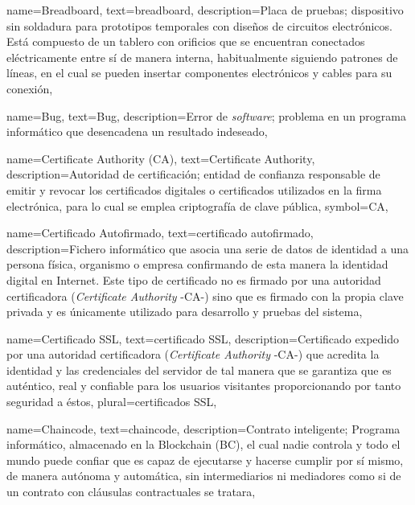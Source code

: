 {
    name={Breadboard},
    text={breadboard},
    description={Placa de pruebas; dispositivo sin soldadura para prototipos temporales con diseños de circuitos electrónicos. Está compuesto de un tablero con orificios que se encuentran conectados eléctricamente entre sí de manera interna, habitualmente siguiendo patrones de líneas, en el cual se pueden insertar componentes electrónicos y cables para su conexión},
}

{
    name={Bug},
    text={Bug},
    description={Error de \textit{software}; problema en un programa informático que desencadena un resultado indeseado},
}

{
    name={Certificate Authority (CA)},
    text={Certificate Authority},
    description={Autoridad de certificación; entidad de confianza responsable de emitir y revocar los certificados digitales o certificados utilizados en la firma electrónica, para lo cual se emplea criptografía de clave pública},
    symbol={CA},
}

{
    name={Certificado Autofirmado},
    text={certificado autofirmado},
    description={Fichero informático que asocia una serie de datos de identidad a una persona física, organismo o empresa confirmando de esta manera la identidad digital en Internet. Este tipo de certificado no es firmado por una autoridad certificadora (\textit{Certificate Authority} -CA-) sino que es firmado con la propia clave privada y es únicamente utilizado para desarrollo y pruebas del sistema},
}

{
    name={Certificado SSL},
    text={certificado SSL},
    description={Certificado expedido por una autoridad certificadora (\textit{Certificate Authority} -CA-) que acredita la identidad y las credenciales del servidor de tal manera que se garantiza que es auténtico, real y confiable para los usuarios visitantes proporcionando por tanto seguridad a éstos},
    plural={certificados SSL},
}

{
    name={Chaincode},
    text={chaincode},
    description={Contrato inteligente; Programa informático, almacenado en la Blockchain (BC), el cual nadie controla y todo el mundo puede confiar que es capaz de ejecutarse y hacerse cumplir por sí mismo, de manera autónoma y automática, sin intermediarios ni mediadores como si de un contrato con cláusulas contractuales se tratara},
}

